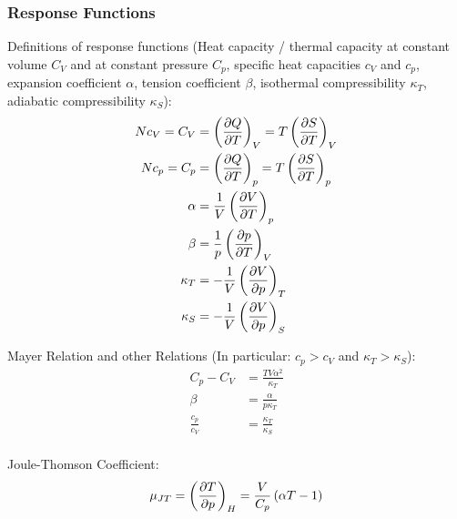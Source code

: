 		\subsubsection{Response Functions}
			\noindent
			Definitions of response functions (Heat capacity / thermal capacity at constant volume $C_V$ and at constant pressure $C_p$, specific heat capacities $c_V$ and $c_p$, expansion coefficient $\alpha$, tension coefficient $\beta$, isothermal compressibility $\kappa_T$, adiabatic compressibility $\kappa_S$):
			\begin{equation}
				\begin{aligned}
					N c_V = C_V &= \left( \frac{\partial Q}{\partial T} \right)_V = T \left( \frac{\partial S}{\partial T} \right)_V \\
					N c_p = C_p &= \left( \frac{\partial Q}{\partial T} \right)_p = T \left( \frac{\partial S}{\partial T} \right)_p \\
					\alpha &= \frac{1}{V} \left( \frac{\partial V}{\partial T} \right)_p \\
					\beta &= \frac{1}{p} \left( \frac{\partial p}{\partial T} \right)_V \\
					\kappa_T &= -\frac{1}{V} \left( \frac{\partial V}{\partial p} \right)_T \\
					\kappa_S &= -\frac{1}{V} \left( \frac{\partial V}{\partial p} \right)_S \\
				\end{aligned}
			\end{equation}

			\noindent
			Mayer Relation and other Relations  (In particular: $c_p > c_V$ and $\kappa_T > \kappa_S$):
			\begin{equation}
				\begin{aligned}
					C_p - C_V &= \frac{TV\alpha^2}{\kappa_T} \\
					\beta &= \frac{\alpha}{p \kappa_T} \\
					\frac{c_p}{c_V} &= \frac{\kappa_T}{\kappa_S} \\
				\end{aligned}
			\end{equation}

			\noindent
			Joule-Thomson Coefficient:
			\begin{equation}
				\mu_{JT} = \left( \frac{\partial T}{\partial p} \right)_H = \frac{V}{C_p}\left(\alpha T - 1\right)
			\end{equation}

